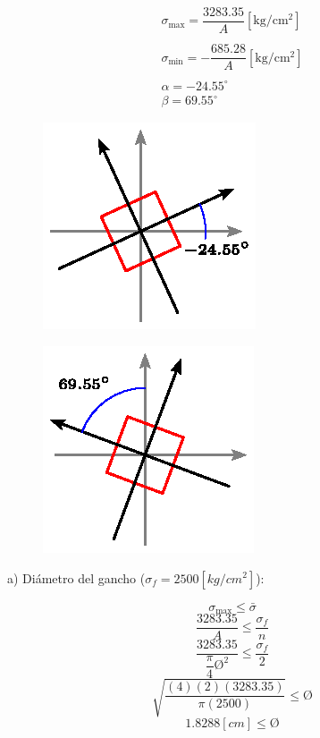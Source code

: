 \documentclass[letter,10pt,twoside]{article}
\begin{document}
\begin{equation*}
\boxed{
    \begin{array}{l}
        \sigma_{\text{max}} = \dfrac{3283.35}{A}[\text{kg}/\text{cm}^2] \\
        \\
        \sigma_{\text{min}} = -\dfrac{685.28}{A}[\text{kg}/\text{cm}^2] \\
        \\
        \alpha = -24.55^\circ \\
        \beta = 69.55^\circ
    \end{array}
}
\end{equation*}

\begin{figure}[H]
\centering
\includegraphics[scale=1.6]{resources/f72.eps}
\end{figure}

\begin{figure}[H]
\centering
\includegraphics[scale=1.6]{resources/f73.eps}
\end{figure}

a) Diámetro del gancho ($\sigma_f = 2500[kg/cm^2]$):

\begin{equation*}
    \sigma_{\text{max}} \le \bar{\sigma}
\end{equation*}
\begin{equation*}
    \frac{3283.35}{A} \le \frac{\sigma_f}{n}
\end{equation*}
\begin{equation*}
    \frac{3283.35}{\dfrac{\pi}{4} \text{\O}^2} \le \frac{\sigma_f}{2}
\end{equation*}
\begin{equation*}
    \sqrt{\frac{(4)(2)(3283.35)}{\pi(2500)}} \le \text{\O}
\end{equation*}
\begin{equation*}
    1.8288[cm] \le \text{\O}
\end{equation*}
\end{document}
